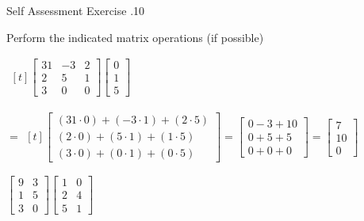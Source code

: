 \documentclass[\main/notes.tex]{subfiles}
\begin{document}
				\begin{exercise}{Self Assessment Exercise \thechapter.10}
					\begin{questions}
						\item Perform the indicated matrix operations (if possible)
							\begin{questions}
								\item 
									$ \begin{aligned}[t]
										{\begin{bmatrix}
											31 & -3 & 2\\
											2 & 5 & 1\\
											3 & 0 & 0
										\end{bmatrix} \begin{bmatrix}
											0 \\ 1 \\ 5
										\end{bmatrix}}
									\end{aligned}$
									\begin{answer}
									$ = \begin{aligned}[t]
									\begin{bmatrix}
											(31 \cdot 0) + (-3 \cdot 1) + (2 \cdot 5)\\
											(2 \cdot 0) + (5 \cdot 1) + (1 \cdot 5)\\
											(3 \cdot 0) + (0 \cdot 1) + (0 \cdot 5)
										\end{bmatrix}
										= \begin{bmatrix}
											0 - 3 + 10\\
											0 + 5 + 5\\
											0 + 0 + 0
										\end{bmatrix}
										= \begin{bmatrix}
											7\\
											10\\
											0
										\end{bmatrix}
									\end{aligned} $
								\end{answer}
								\item $\begin{bmatrix}9 & 3\\ 1 & 5\\ 3 & 0\end{bmatrix}\begin{bmatrix}1 & 0\\ 2 & 4\\ 5 & 1\end{bmatrix}$\\

\end{questions}
\end{questions}
\end{exercise}
\end{document}
